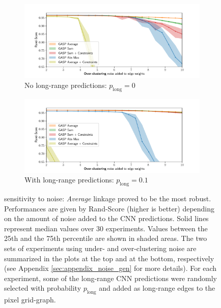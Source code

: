 \begin{figure}
        \begin{subfigure}[t]{0.49 \textwidth}
        \centering
        \includegraphics[width=\textwidth,trim=0.53in 0.1in 0.65in 0.45in,clip]{./figs/noise_plots/over_segment_plots_0.pdf}
        \caption{No long-range predictions: $p_{\mathrm{long}}=0$} \label{fig:merge_noise_only_direct}
    \end{subfigure} \hfill
    \begin{subfigure}[t]{0.49 \textwidth}
        \centering
        \includegraphics[width=\textwidth,trim=0.53in 0.1in 0.65in 0.45in,clip]{./figs/noise_plots/over_segment_plots_1.pdf}
        \caption{With long-range predictions: $p_{\mathrm{long}}=0.1$} \label{fig:merge_noise_with_long_range}
    \end{subfigure}
\caption{\algname{} sensitivity to noise: \emph{Average} linkage proved to be the most robust. Performances are given by Rand-Score (higher is better) depending on the amount of noise added to the CNN predictions. Solid lines represent median values over 30 experiments. Values between the 25th and the 75th percentile are shown in shaded areas. The two sets of experiments using under- and over-clustering noise are summarized in the plots at the top and at the bottom, respectively (see Appendix \ref{sec:appendix_noise_gen} for more details). For each experiment, some of the long-range CNN predictions were randomly selected with probability $p_{\mathrm{long}}$ and added as long-range edges to the pixel grid-graph.
}\label{fig:noise_plots}
\end{figure}


